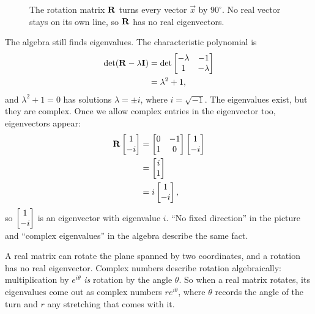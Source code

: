 \begin{figure}[htbp]
\centering
{}
\caption{The rotation matrix $\mathbf{R}$ turns every vector $\vec x$ by $90^\circ$. No real vector stays on its own line, so $\mathbf{R}$ has no real eigenvectors.}
\label{ch32:rotation}
\end{figure}


The algebra still finds eigenvalues. The characteristic polynomial is
\begin{align*}
  \det(\mathbf{R} - \lambda\mathbf{I}) &= \det\begin{bmatrix}-\lambda & -1 \\ 1 & -\lambda\end{bmatrix} \\
  &= \lambda^2 + 1,
\end{align*}
and $\lambda^2+1=0$ has solutions $\lambda = \pm i$, where $i=\sqrt{-1}$. The
eigenvalues exist, but they are complex. Once we allow complex entries in
the eigenvector too, eigenvectors appear:
\begin{align*}
  \mathbf{R} \begin{bmatrix}1 \\ -i\end{bmatrix} &= \begin{bmatrix}0 & -1 \\ 1 & 0\end{bmatrix}\begin{bmatrix}1\\-i\end{bmatrix} \\
  &= \begin{bmatrix}i \\ 1\end{bmatrix} \\
  &= i\begin{bmatrix}1 \\ -i\end{bmatrix},
\end{align*}
so $\begin{bmatrix}1\\-i\end{bmatrix}$ is an eigenvector with eigenvalue $i$. ``No fixed direction''
in the picture and ``complex eigenvalues'' in the algebra describe the same fact.

\begin{intuitionbox}
A real matrix can rotate the plane spanned by two coordinates, and a rotation has
no real eigenvector. Complex numbers describe rotation algebraically:
multiplication by $e^{i\theta}$ \emph{is} rotation by the angle $\theta$. So when a
real matrix rotates, its eigenvalues come out as complex numbers $re^{i\theta}$,
where $\theta$ records the angle of the turn and $r$ any stretching that comes
with it.
\end{intuitionbox}

